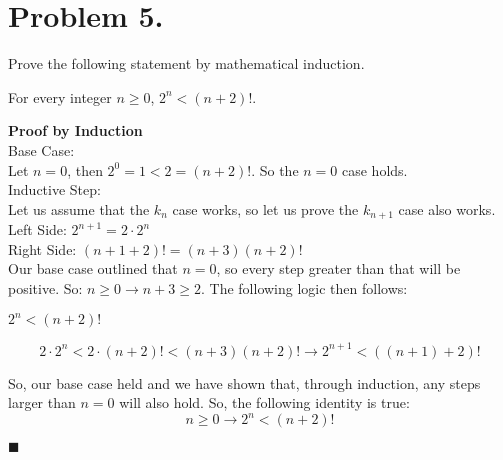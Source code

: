 \documentclass[11pt]{article}
\begin{document}
\newpage


\section*{Problem 5.}

Prove the following statement by mathematical induction.
\newline

For every integer $n\geq 0$, $2^n<(n+2)!$.
\newline

{\bf Proof by Induction}\\

Base Case:\\
Let $n=0$, then $2^0 = 1 < 2 = (n+2)!$. So the $n=0$ case holds.\\

Inductive Step:\\
Let us assume that the $k_n$ case works, so let us prove the $k_{n+1}$ case also works.\\
Left Side: \quad  $2^{n+1} = 2\cdot 2^n$\\
Right Side: \quad $(n+1+2)! = (n+3)(n+2)!$\\

Our base case outlined that $n=0$, so every step greater than that will be positive. So: $n\geq 0 \rightarrow n+3 \geq 2$. The following logic then follows:
\begin{center}
    $2^n < (n+2)!$ 
\end{center}
\[2\cdot 2^n < 2 \cdot (n+2)! < (n+3)(n+2)! \rightarrow 2^{n+1} < ((n+1)+2)!\]

So, our base case held and we have shown that, through induction, any steps larger than $n=0$ will also hold. So, the following identity is true:
\[ n\geq 0 \rightarrow 2^n<(n+2)!\]
\begin{flushright}$\blacksquare$\end{flushright}
\end{document}
